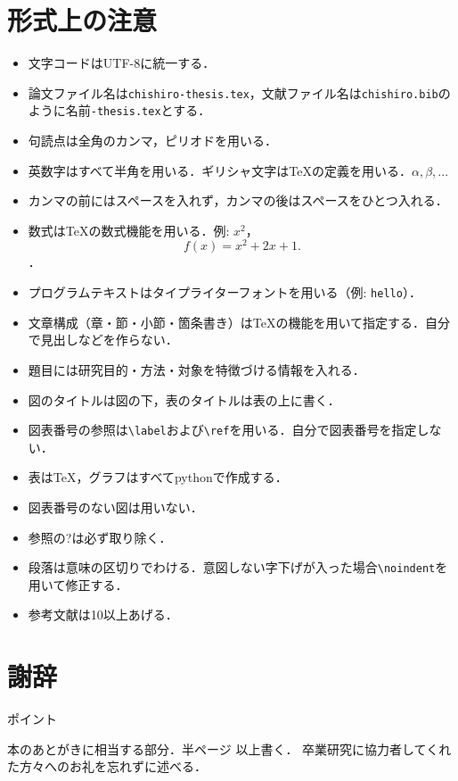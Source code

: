 \documentclass[a4j,11pt,report]{jsbook}
\newcommand{\point}[1]{
\begin{itembox}[l]{ポイント}
  #1
\end{itembox}
}
\begin{document}
\chapter{形式上の注意}

\begin{itemize}
  \item 文字コードはUTF-8に統一する．
  \item 論文ファイル名は\texttt{chishiro-thesis.tex}，文献ファイル名は\texttt{chishiro.bib}のように名前\texttt{-thesis.tex}とする．
  \item 句読点は全角のカンマ，ピリオドを用いる．
  \item 英数字はすべて半角を用いる．ギリシャ文字は{\TeX}の定義を用いる．$\alpha, \beta, ...$
  \item カンマの前にはスペースを入れず，カンマの後はスペースをひとつ入れる．
  \item 数式は{\TeX}の数式機能を用いる．例: $x^2$，\[f(x) = x^2 + 2x + 1.\]．
  \item プログラムテキストはタイプライターフォントを用いる（例: \texttt{hello}）．
  \item 文章構成（章・節・小節・箇条書き）は{\TeX}の機能を用いて指定する．自分で見出しなどを作らない．
  \item 題目には研究目的・方法・対象を特徴づける情報を入れる．
  \item 図のタイトルは図の下，表のタイトルは表の上に書く．
  \item 図表番号の参照は\verb#\label#および\verb#\ref#を用いる．自分で図表番号を指定しない．
  \item 表は{\TeX}，グラフはすべてpythonで作成する．
  \item 図表番号のない図は用いない．
  \item 参照の?は必ず取り除く．
  \item 段落は意味の区切りでわける．意図しない字下げが入った場合\verb#\noindent#を用いて修正する．
  \item 参考文献は10以上あげる．
\end{itemize}
\fi


\chapter*{謝辞 \label{ch:acknowledgement}}
\thispagestyle{empty}
\if
\point{
本のあとがきに相当する部分．半ページ 以上書く．
卒業研究に協力者してくれた方々へのお礼を忘れずに述べる．
}
\fi
\cite{ZeroDeep}



\end{document}

